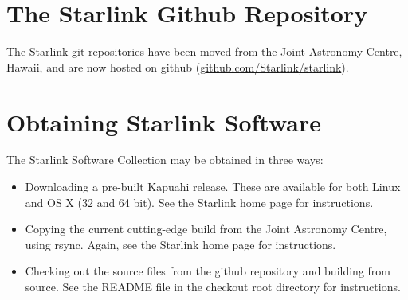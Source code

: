 \section{The Starlink Github Repository}
The Starlink git repositories have been moved from the Joint Astronomy Centre, Hawaii, and are now hosted on github (\url{github.com/Starlink/starlink}).

\section{Obtaining Starlink Software}
The Starlink Software Collection may be obtained in three ways:
\begin{itemize}
\item Downloading a pre-built Kapuahi release. These are available for both Linux and OS X (32 and 64 bit). See the Starlink home page for instructions.
\item Copying the current cutting-edge build from the Joint Astronomy Centre, using rsync. Again, see the Starlink home page for instructions.
\item Checking out the source files from the github repository and building from source. See the README file in the checkout root directory for instructions.
\end{itemize}



